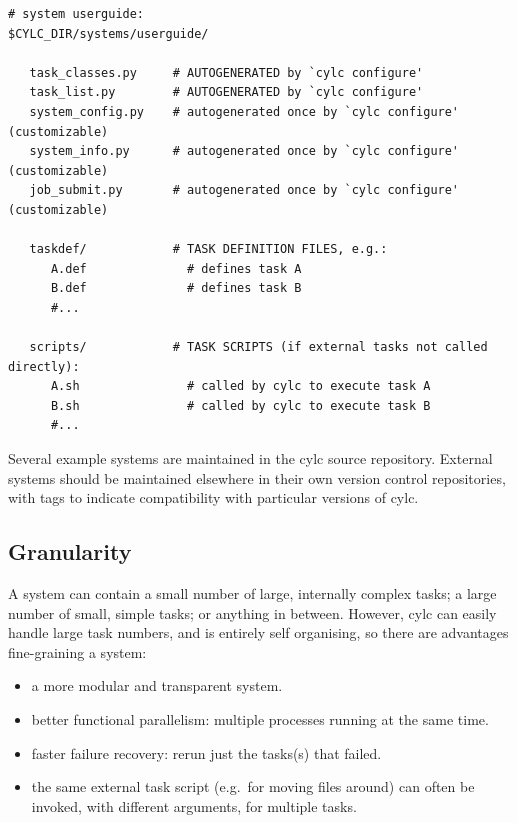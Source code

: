 \documentclass[11pt,a4paper]{article}
\begin{document}
\lstset{language=bash}

\begin{lstlisting}
# system userguide:
$CYLC_DIR/systems/userguide/

   task_classes.py     # AUTOGENERATED by `cylc configure' 
   task_list.py        # AUTOGENERATED by `cylc configure' 
   system_config.py    # autogenerated once by `cylc configure' (customizable)
   system_info.py      # autogenerated once by `cylc configure' (customizable)
   job_submit.py       # autogenerated once by `cylc configure' (customizable)

   taskdef/            # TASK DEFINITION FILES, e.g.:
      A.def              # defines task A
      B.def              # defines task B
      #...

   scripts/            # TASK SCRIPTS (if external tasks not called directly):
      A.sh               # called by cylc to execute task A
      B.sh               # called by cylc to execute task B
      #...
\end{lstlisting}

Several example systems are maintained in the cylc source repository.
External systems should be maintained elsewhere in their own version
control repositories, with tags to indicate compatibility with
particular versions of cylc.

\subsection{Granularity} 
\label{Granularity}

A system can contain a small number of large, internally complex tasks;
a large number of small, simple tasks; or anything in between. However,
cylc can easily handle large task numbers, and is entirely self
organising, so there are advantages fine-graining a system:

\begin{itemize}
    \item a more modular and transparent system.

    \item better functional parallelism: multiple processes running
        at the same time.

    \item faster failure recovery: rerun just the tasks(s) that failed. 

    \item the same external task script (e.g.\ for moving files around)
        can often be invoked, with different arguments, for multiple
        tasks.

\end{itemize}
\end{document}
